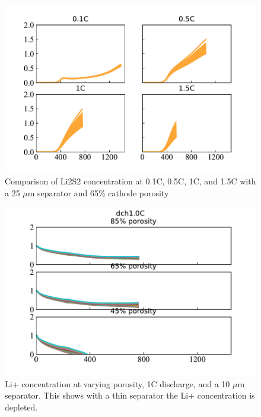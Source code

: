 \documentclass{elsarticle}
\begin{document}
\begin{figure}
    \centering
    \includegraphics[width=\textwidth]{Figures/Ck_Li2S2.pdf}
    \caption{Comparison of Li2S2 concentration at 0.1C, 0.5C, 1C, and 1.5C with a 25 $\mu$m separator and 65\% cathode porosity}
    \label{fig:speciescomparisonLi2S2}
\end{figure}

\begin{figure}
    \centering
    \includegraphics[width=\textwidth]{Figures/C_Lipdch1.0C.pdf}
    \caption{Li+ concentration at varying porosity, 1C discharge, and a 10 $\mu$m separator. This shows with a thin separator the Li+ concentration is depleted.}
    \label{fig:Liconc10umsep}
\end{figure}
\end{document}
